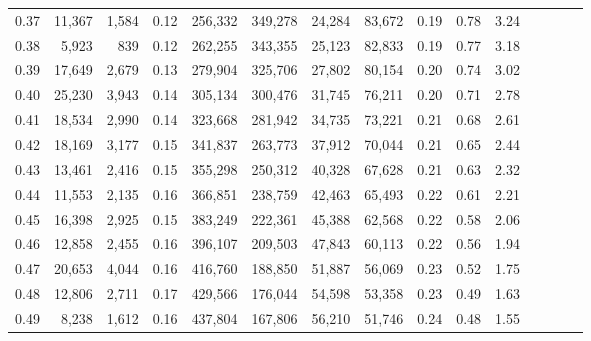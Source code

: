 \begin{tabular}{rrrcrrrrrrrrrrr}
0.37 &  11,367 &  1,584 &                                       0.12 &  256,332 &  349,278 &   24,284 &   83,672 &  0.19 &  0.78 &                         3.24 \\
0.38 &   5,923 &    839 &                                       0.12 &  262,255 &  343,355 &   25,123 &   82,833 &  0.19 &  0.77 &                         3.18 \\
0.39 &  17,649 &  2,679 &                                       0.13 &  279,904 &  325,706 &   27,802 &   80,154 &  0.20 &  0.74 &                         3.02 \\
0.40 &  25,230 &  3,943 &                                       0.14 &  305,134 &  300,476 &   31,745 &   76,211 &  0.20 &  0.71 &                         2.78 \\
0.41 &  18,534 &  2,990 &                                       0.14 &  323,668 &  281,942 &   34,735 &   73,221 &  0.21 &  0.68 &                         2.61 \\
0.42 &  18,169 &  3,177 &                                       0.15 &  341,837 &  263,773 &   37,912 &   70,044 &  0.21 &  0.65 &                         2.44 \\
0.43 &  13,461 &  2,416 &                                       0.15 &  355,298 &  250,312 &   40,328 &   67,628 &  0.21 &  0.63 &                         2.32 \\
0.44 &  11,553 &  2,135 &                                       0.16 &  366,851 &  238,759 &   42,463 &   65,493 &  0.22 &  0.61 &                         2.21 \\
0.45 &  16,398 &  2,925 &                                       0.15 &  383,249 &  222,361 &   45,388 &   62,568 &  0.22 &  0.58 &                         2.06 \\
0.46 &  12,858 &  2,455 &                                       0.16 &  396,107 &  209,503 &   47,843 &   60,113 &  0.22 &  0.56 &                         1.94 \\
0.47 &  20,653 &  4,044 &                                       0.16 &  416,760 &  188,850 &   51,887 &   56,069 &  0.23 &  0.52 &                         1.75 \\
0.48 &  12,806 &  2,711 &                                       0.17 &  429,566 &  176,044 &   54,598 &   53,358 &  0.23 &  0.49 &                         1.63 \\
0.49 &   8,238 &  1,612 &                                       0.16 &  437,804 &  167,806 &   56,210 &   51,746 &  0.24 &  0.48 &                         1.55 \\

\end{tabular}
